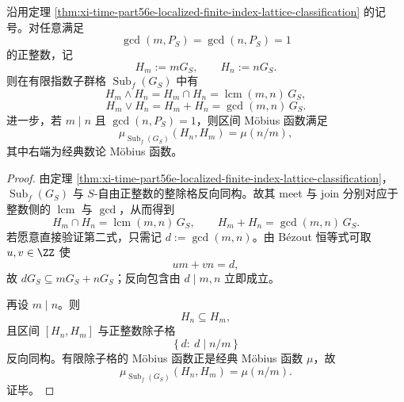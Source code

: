 \begin{corollary}\label{cor:xi-time-part56e-localized-finite-index-lattice-gcd-lcm-mobius}
沿用定理 \ref{thm:xi-time-part56e-localized-finite-index-lattice-classification} 的记号。对任意满足
\[
\gcd(m,P_S)=\gcd(n,P_S)=1
\]
的正整数，记
\[
H_m:=mG_S,
\qquad
H_n:=nG_S.
\]
则在有限指数子群格 \(\operatorname{Sub}_f(G_S)\) 中有
\[
H_m\wedge H_n
=
H_m\cap H_n
=
\operatorname{lcm}(m,n)\,G_S,
\]
\[
H_m\vee H_n
=
H_m+H_n
=
\gcd(m,n)\,G_S.
\]
进一步，若 \(m\mid n\) 且 \(\gcd(n,P_S)=1\)，则区间 Möbius 函数满足
\[
\mu_{\operatorname{Sub}_f(G_S)}(H_n,H_m)=\mu(n/m),
\]
其中右端为经典数论 Möbius 函数。
\end{corollary}
\begin{proof}
由定理 \ref{thm:xi-time-part56e-localized-finite-index-lattice-classification}，
\(\operatorname{Sub}_f(G_S)\) 与 \(S\)-自由正整数的整除格反向同构。故其 meet 与 join 分别对应于整数侧的 \(\operatorname{lcm}\) 与 \(\gcd\)，从而得到
\[
H_m\cap H_n=\operatorname{lcm}(m,n)\,G_S,
\qquad
H_m+H_n=\gcd(m,n)\,G_S.
\]
若愿意直接验证第二式，只需记 \(d:=\gcd(m,n)\)。由 Bézout 恒等式可取 \(u,v\in\ZZ\) 使
\[
um+vn=d,
\]
故 \(dG_S\subseteq mG_S+nG_S\)；反向包含由 \(d\mid m,n\) 立即成立。

再设 \(m\mid n\)。则
\[
H_n\subseteq H_m,
\]
且区间 \([H_n,H_m]\) 与正整数除子格
\[
\{\,d:\ d\mid n/m\,\}
\]
反向同构。有限除子格的 Möbius 函数正是经典 Möbius 函数 \(\mu\)，故
\[
\mu_{\operatorname{Sub}_f(G_S)}(H_n,H_m)=\mu(n/m).
\]
证毕。
\end{proof}

